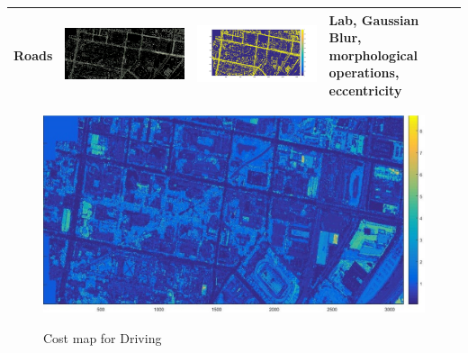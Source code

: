 \documentclass[fleqn,10pt]{SelfArx} %
\begin{document}
\begin{table}
\begin{tabular}{>{\centering\arraybackslash}M{8mm}cc>{\centering\arraybackslash}M{20mm}}
\midrule 
\vspace{-3cm}
\hspace{-0.6cm}
Roads & \includegraphics[clip,scale=0.07]{24rgb.jpg} & \includegraphics[trim={6cm 2.5cm 4.5cm 1.6cm},clip,scale=0.18]{24.jpg} & \vspace{-3cm}Lab, Gaussian Blur, morphological operations, eccentricity \\ 
\bottomrule
\end{tabular} 
\end{table}

\begin{figure}[hbtp]
\caption{Cost map for Driving}
\centering
\includegraphics[scale=0.6]{costs_car.jpg}
\label{fig:costCar}
\end{figure}
\end{document}
